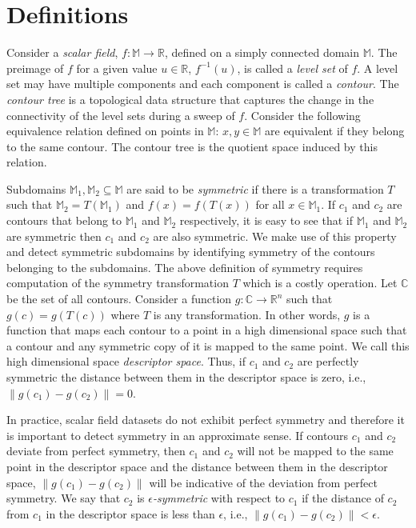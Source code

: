 \documentclass[review,journal]{vgtc}         %
\begin{document}
\section{Definitions}
Consider a \emph{scalar field}, $f : \mathbb{M}  \rightarrow \mathbb{R}$, defined on a 
simply connected domain $\mathbb{M}$. The preimage of $f$ for a given value $u \in \mathbb{R}$, 
$f^{-1}(u)$, is called a \emph{level set} of $f$. A level set may have multiple components
and each component is called a \emph{contour}. The \emph{contour tree} is a topological 
data structure that captures the change in the connectivity of the level sets during a 
sweep of $f$. Consider the following equivalence relation defined on points in $\mathbb{M}$: $x,y 
\in \mathbb{M}$ are equivalent if they belong to the same contour. The contour
tree is the quotient space induced by this relation. 

Subdomains $\mathbb{M}_1, \mathbb{M}_2 \subseteq \mathbb{M}$ are said to be \emph{symmetric} 
if there is a transformation $T$ such that ${\mathbb{M}_2=T(\mathbb{M}_1)}$ and 
${f(x)=f(T(x))}$ for all $x \in \mathbb{M}_1$. If $c_1$ and $c_2$ are contours that belong to 
$\mathbb{M}_1$ and $\mathbb{M}_2$ respectively, it is easy to see that if $\mathbb{M}_1$ and 
$\mathbb{M}_2$ are symmetric then $c_1$ and $c_2$ are also symmetric. We make use of this property
and detect symmetric subdomains by identifying symmetry of the contours belonging to
the subdomains. The above definition of symmetry requires computation of the symmetry 
transformation $T$ which is a costly operation. Let $\mathbb{C}$ be the set of all contours. 
Consider a function $g : \mathbb{C} \rightarrow \mathbb{R}^n$ such that $g(c) = g(T(c))$
where $T$ is any transformation. In other words, $g$ is a function that maps each
contour to a point in a high dimensional space such that a contour and any symmetric
copy of it is mapped to the same point. We call this high dimensional space
\emph{descriptor space}. Thus, if $c_1$ and $c_2$ are perfectly symmetric
the distance between them in the descriptor space is zero, i.e., 
$\lVert g(c_1)-g(c_2) \rVert = 0$. 

In practice, scalar field datasets do not exhibit perfect symmetry and therefore
it is important to detect symmetry in an approximate sense. If contours $c_1$ and 
$c_2$ deviate from perfect symmetry, then $c_1$ and $c_2$ will not be mapped
to the same point in the descriptor space and the distance between
them in the descriptor space, $\lVert g(c_1)-g(c_2) \rVert$ will be indicative
of the deviation from perfect symmetry. We say that $c_2$ is \emph{$\epsilon$-symmetric} 
with respect to $c_1$ if the distance of $c_2$ from $c_1$ in the descriptor 
space is less than $\epsilon$, i.e., $\lVert g(c_1)-g(c_2) \rVert < \epsilon$.
\end{document}
